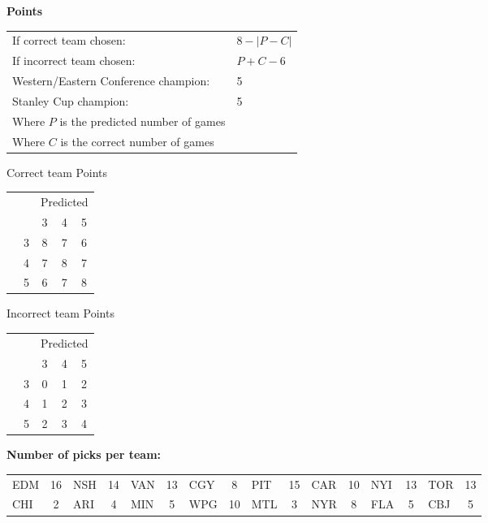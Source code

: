 \documentclass[10pt]{article}
\newcommand{\mccn}[2]{\multicolumn{#1}{c}{#2}}
\begin{document}
\begin{table}[!htb]
    \begin{minipage}[t]{.27\linewidth}
    	{\bf Points}\\
		\begin{tabular}{l l}
			If correct team chosen:	& $8 - |P-C|$\\
			If incorrect team chosen:	& $P+C-6$\\
			Western/Eastern Conference champion:	& 5\\
			Stanley Cup champion:		& 5\\
			Where $P$ is the predicted number of games&\\
			Where $C$ is the correct number of games&
		\end{tabular}
	\end{minipage}
	\begin{minipage}[t]{0.12\linewidth}
	Correct team Points\\
	\begin{tabular}{c l | c c c }
		\mccn{2}{} & \mccn{3}{Predicted}\\
		& & 3 & 4 & 5\\\cline{2-5}
		\parbox[t]{2mm}{}&3 & 8 & 7 & 6\\
		&4 & 7 & 8 & 7\\
		&5 & 6 & 7 & 8\\
	\end{tabular}
	\end{minipage}
	\begin{minipage}[t]{0.12\linewidth}
	Incorrect team Points\\
	\begin{tabular}{c l | c c c }
		\mccn{2}{} & \mccn{3}{Predicted}\\
		& & 3 & 4 & 5\\\cline{2-5}
		\parbox[t]{2mm}{}&3 & 0 & 1 & 2\\
		&4 & 1 & 2 & 3\\
		&5 & 2 & 3 & 4\\
	\end{tabular}
	\end{minipage}
    \begin{minipage}[t]{.45\linewidth}
    	{\bf Number of picks per team:}\\
\begin{tabular}{lc | lc | lc | lc | lc | lc | lc | lc }
EDM&16&NSH&14&VAN&13&CGY&8&PIT&15&CAR&10&NYI&13&TOR&13\\
CHI&2&ARI&4&MIN&5&WPG&10&MTL&3&NYR&8&FLA&5&CBJ&5\\
        \end{tabular}
    \end{minipage}
\end{table}
\end{document}
